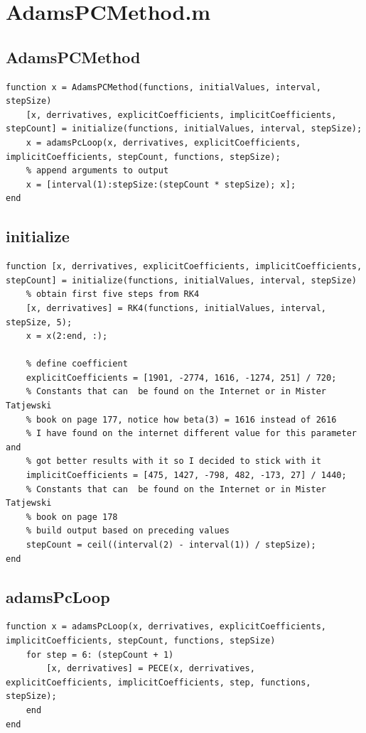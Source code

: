 \section{AdamsPCMethod.m}
\subsection{AdamsPCMethod}
\begin{simplechar}
\begin{lstlisting}
function x = AdamsPCMethod(functions, initialValues, interval, stepSize)
    [x, derrivatives, explicitCoefficients, implicitCoefficients, stepCount] = initialize(functions, initialValues, interval, stepSize);
    x = adamsPcLoop(x, derrivatives, explicitCoefficients, implicitCoefficients, stepCount, functions, stepSize);
    % append arguments to output
    x = [interval(1):stepSize:(stepCount * stepSize); x];
end
\end{lstlisting}
\end{simplechar}

\subsection{initialize}
\begin{simplechar}
\begin{lstlisting}
function [x, derrivatives, explicitCoefficients, implicitCoefficients, stepCount] = initialize(functions, initialValues, interval, stepSize)
    % obtain first five steps from RK4
    [x, derrivatives] = RK4(functions, initialValues, interval, stepSize, 5);
    x = x(2:end, :);

    % define coefficient
    explicitCoefficients = [1901, -2774, 1616, -1274, 251] / 720;
    % Constants that can  be found on the Internet or in Mister Tatjewski
    % book on page 177, notice how beta(3) = 1616 instead of 2616
    % I have found on the internet different value for this parameter and
    % got better results with it so I decided to stick with it
    implicitCoefficients = [475, 1427, -798, 482, -173, 27] / 1440;
    % Constants that can  be found on the Internet or in Mister Tatjewski
    % book on page 178
    % build output based on preceding values
    stepCount = ceil((interval(2) - interval(1)) / stepSize);
end
\end{lstlisting}
\end{simplechar}

\subsection{adamsPcLoop}
\begin{simplechar}
\begin{lstlisting}
function x = adamsPcLoop(x, derrivatives, explicitCoefficients, implicitCoefficients, stepCount, functions, stepSize)
    for step = 6: (stepCount + 1)
        [x, derrivatives] = PECE(x, derrivatives, explicitCoefficients, implicitCoefficients, step, functions, stepSize);
    end
end
\end{lstlisting}
\end{simplechar}

